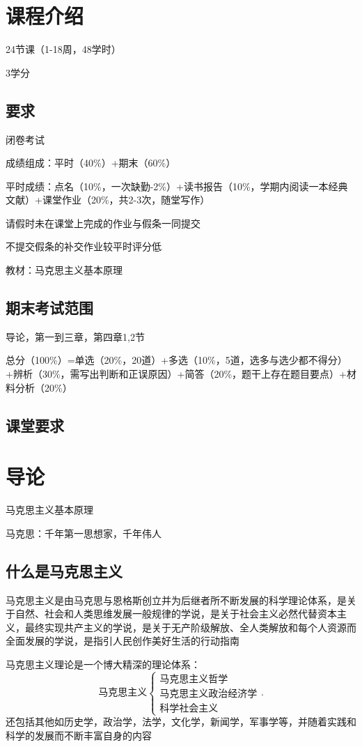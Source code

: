 \section*{课程介绍}%
\label{subsub:课程介绍}
24节课（1-18周，48学时）

3学分

\subsection*{要求}%
\label{sub:要求}
闭卷考试

成绩组成：平时（40\%）+期末（60\%）

平时成绩：点名（10\%，一次缺勤-2\%）+读书报告（10\%，学期内阅读一本经典文献）+课堂作业（20\%，共2-3次，随堂写作）

请假时未在课堂上完成的作业与假条一同提交

不提交假条的补交作业较平时评分低

教材：马克思主义基本原理

\subsection*{期末考试范围}%
\label{sub:期末考试范围}
导论，第一到三章，第四章1,2节

总分（100\%）=单选（20\%，20道）+多选（10\%，5道，选多与选少都不得分）+辨析（30\%，需写出判断和正误原因）+简答（20\%，题干上存在题目要点）+材料分析（20\%）
\subsection*{课堂要求}%
\label{sub:课堂要求}

\section{导论}%
\label{sec:导论}
马克思主义基本原理

马克思：千年第一思想家，千年伟人
\subsection{什么是马克思主义}%
\label{sub:什么是马克思主义}
\begin{notation}
    马克思主义是由马克思与恩格斯创立并为后继者所不断发展的科学理论体系，是关于自然、社会和人类思维发展一般规律的学说，是关于社会主义必然代替资本主义，最终实现共产主义的学说，是关于无产阶级解放、全人类解放和每个人资源而全面发展的学说，是指引人民创作美好生活的行动指南
\end{notation}
马克思主义理论是一个博大精深的理论体系：
\[
    \mbox{马克思主义}
    \begin{cases}
        \mbox{马克思主义哲学}\\ 
        \mbox{马克思主义政治经济学}\\ 
        \mbox{科学社会主义}
    \end{cases}
.\] 
还包括其他如历史学，政治学，法学，文化学，新闻学，军事学等，并随着实践和科学的发展而不断丰富自身的内容

